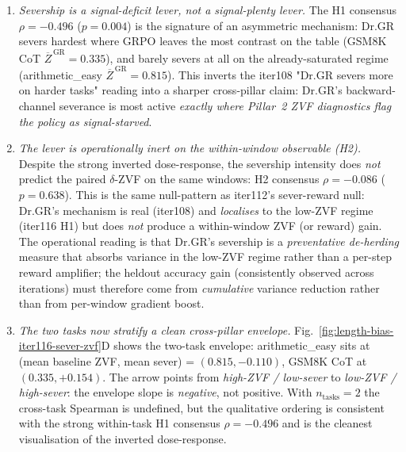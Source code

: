 \begin{enumerate}
\item \emph{Severship is a signal-\emph{deficit} lever, not a
signal-\emph{plenty} lever.}  The H1 consensus
$\rho=-0.496$ ($p=0.004$) is the signature of an asymmetric
mechanism: Dr.GR severs hardest where GRPO leaves the most
contrast on the table (GSM8K CoT $\overline{Z}^{\,\mathrm{GR}}{=}0.335$),
and barely severs at all on the already-saturated regime
(arithmetic\_easy $\overline{Z}^{\,\mathrm{GR}}{=}0.815$).  This
inverts the iter108 "Dr.GR severs more on harder tasks" reading
into a sharper cross-pillar claim: Dr.GR's backward-channel
severance is most active \emph{exactly where Pillar~2 ZVF
diagnostics flag the policy as signal-starved}.

\item \emph{The lever is operationally inert on the within-window
observable (H2).}  Despite the strong inverted dose-response, the
severship intensity does \emph{not} predict the paired
$\delta$-ZVF on the same windows: H2 consensus $\rho=-0.086$
($p{=}0.638$).  This is the same null-pattern as iter112's
sever-reward null: Dr.GR's mechanism is real (iter108) and
\emph{localises} to the low-ZVF regime (iter116 H1) but does
\emph{not} produce a within-window ZVF (or reward) gain.  The
operational reading is that Dr.GR's severship is a
\emph{preventative de-herding} measure that absorbs variance in
the low-ZVF regime rather than a per-step reward amplifier; the
heldout accuracy gain (consistently observed across iterations)
must therefore come from \emph{cumulative} variance reduction
rather than from per-window gradient boost.

\item \emph{The two tasks now stratify a clean cross-pillar
envelope.}  Fig.~\ref{fig:length-bias-iter116-sever-zvf}D shows
the two-task envelope: arithmetic\_easy sits at
(mean baseline ZVF, mean sever) = $(0.815,-0.110)$, GSM8K CoT at
$(0.335,+0.154)$.  The arrow points from
\emph{high-ZVF / low-sever} to \emph{low-ZVF / high-sever}: the
envelope slope is \emph{negative}, not positive.  With $n_{\mathrm{tasks}}=2$
the cross-task Spearman is undefined, but the qualitative
ordering is consistent with the strong within-task H1 consensus
$\rho=-0.496$ and is the cleanest visualisation of the inverted
dose-response.
\end{enumerate}

